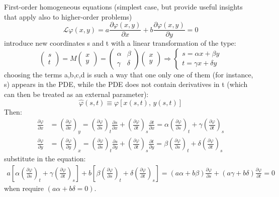 \documentclass{article}
\begin{document}
\newpage
\noindent
First-order homogeneous equations (simplest case, but provide useful insights that apply also to higher-order problems)
\begin{equation}
    \mathcal{L} \varphi(x, y) = a \frac{\partial \varphi(x, y)}{\partial x}
+ b \frac{\partial \varphi(x, y)}{\partial y} = 0
\end{equation}
introduce new coordinates s and t with a linear transformation of the type:
\begin{equation}
    \begin{pmatrix}
s \\
t
\end{pmatrix}
=
M
\begin{pmatrix}
x \\
y
\end{pmatrix}
=
\begin{pmatrix}
\alpha & \beta \\
\gamma & \delta
\end{pmatrix}
\begin{pmatrix}
x \\
y
\end{pmatrix}
\Rightarrow
\begin{cases}
s = \alpha x + \beta y \\
t = \gamma x + \delta y
\end{cases}
\end{equation}
choosing the terms a,b,c,d is such a way that one only one of them (for instance, s) appears in the PDE, while the PDE does not contain derivatives in t (which can then be treated as an external parameter):
\begin{equation}
    \hat{\varphi}(s, t) \equiv \varphi\left[ x(s, t),\, y(s, t) \right]
\end{equation}
Then:
\begin{align}
    \frac{\partial \varphi}{\partial x}
&= \left( \frac{\partial \varphi}{\partial x} \right)_y
= \left( \frac{\partial \varphi}{\partial s} \right)_t \frac{\partial s}{\partial x}
+ \left( \frac{\partial \varphi}{\partial t} \right)_s \frac{\partial t}{\partial x}
= \alpha \left( \frac{\partial \varphi}{\partial s} \right)_t
+ \gamma \left( \frac{\partial \varphi}{\partial t} \right)_s\\
\frac{\partial \varphi}{\partial y}
&= \left( \frac{\partial \varphi}{\partial y} \right)_x
= \left( \frac{\partial \varphi}{\partial s} \right)_t \frac{\partial s}{\partial y}
+ \left( \frac{\partial \varphi}{\partial t} \right)_s \frac{\partial t}{\partial y}
= \beta \left( \frac{\partial \varphi}{\partial s} \right)_t
+ \delta \left( \frac{\partial \varphi}{\partial t} \right)_s
\end{align}
substitute in the equation:
\begin{align}
    a \left[ \alpha \left( \frac{\partial \varphi}{\partial s} \right)_t + \gamma \left( \frac{\partial \varphi}{\partial t} \right)_s \right]
+ b \left[ \beta \left( \frac{\partial \varphi}{\partial s} \right)_t + \delta \left( \frac{\partial \varphi}{\partial t} \right)_s \right]= (a\alpha + b\beta) \frac{\partial \varphi}{\partial s}
+ (a\gamma + b\delta) \frac{\partial \varphi}{\partial t}
= 0
\end{align}
when require $(a\alpha+b\delta = 0)$.
\end{document}
